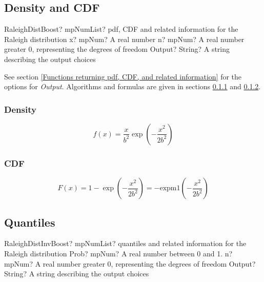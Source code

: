 \subsection{Density and CDF}

\begin{mpFunctionsExtract}
	\mpFunctionThreeNotImplemented
	{RaleighDistBoost? mpNumList? pdf, CDF and related information for the Raleigh distribution}
	{x? mpNum? A real number}
	{n? mpNum? A real number greater 0, representing the degrees of freedom}
	{Output? String? A string describing the output choices}
\end{mpFunctionsExtract}



\vspace{0.3cm}
See section \ref{Functions returning pdf, CDF, and related information} for the options for {\itshape\sffamily Output}. Algorithms and formulas are given in sections \ref{RaleighDistributionDensity} and \ref{RaleighDistributionCDF}.


\subsubsection{Density}
\label{RaleighDistributionDensity}

\begin{equation} 
	f(x)= \frac{x}{b^2} \exp \left(- \frac{x^2}{2b^2}\right)
\end{equation}


\subsubsection{CDF}
\label{RaleighDistributionCDF}

\begin{equation} 
	F(x)= 1 - \exp \left(- \frac{x^2}{2b^2}\right)
	= -\text{expm1} \left(- \frac{x^2}{2b^2}\right)
\end{equation}



\subsection{Quantiles}

\begin{mpFunctionsExtract}
	\mpFunctionThreeNotImplemented
	{RaleighDistInvBoost? mpNumList? quantiles and related information for the Raleigh distribution}
	{Prob? mpNum? A real number between 0 and 1.}
	{n? mpNum? A real number greater 0, representing the degrees of freedom}
	{Output? String? A string describing the output choices}
\end{mpFunctionsExtract}

